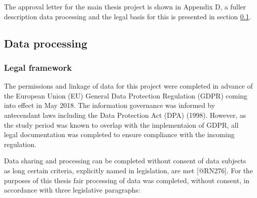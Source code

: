 \documentclass[]{article}
\begin{document}
The approval letter for the main thesis project is shown in Appendix D,
a fuller description data processing and the legal basis for this is
presented in section \ref{subsec:dat-process}.

\subsection{Data processing}\label{subsec:dat-process}

\subsubsection{Legal framework}\label{subsec:dat-legal}

The permissions and linkage of data for this project were completed in
advance of the European Union (EU) General Data Protection Regulation
(GDPR) coming into effect in May 2018. The information governance was
informed by antecendant laws including the Data Protection Act (DPA)
(1998). However, as the study period was known to overlap with the
implementaion of GDPR, all legal documentation was completed to ensure
compliance with the incoming regulation.

Data sharing and processing can be completed without consent of data
subjects as long certain criteria, explicitly named in legislation, are
met {[}@RN276{]}. For the purposes of this thesis fair processing of
data was completed, without consent, in accordance with three
legislative paragraphs:
\end{document}
